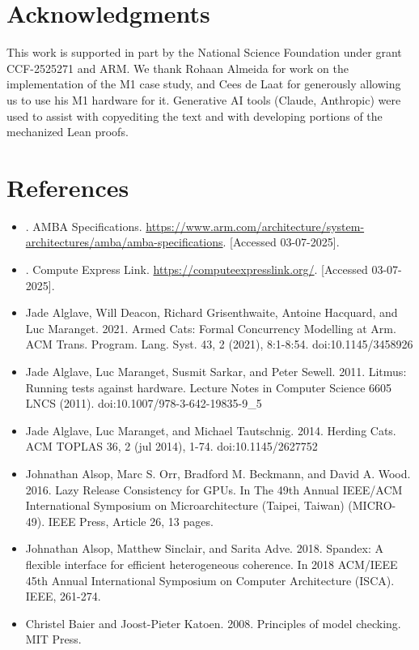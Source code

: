 \documentclass[10pt]{article}
\begin{document}
\section*{Acknowledgments}
This work is supported in part by the National Science Foundation under grant CCF-2525271 and ARM. We thank Rohaan Almeida for work on the implementation of the M1 case study, and Cees de Laat for generously allowing us to use his M1 hardware for it. Generative AI tools (Claude, Anthropic) were used to assist with copyediting the text and with developing portions of the mechanized Lean proofs.

\section*{References}
\begin{itemize}
  \item[] [1] [n. d.]. AMBA Specifications. \href{https://www.arm.com/architecture/system-architectures/amba/amba-specifications}{https://www.arm.com/architecture/system-architectures/amba/amba-specifications}. [Accessed 03-07-2025].
  \item[] [2] [n.d.]. Compute Express Link. \href{https://computeexpresslink.org/}{https://computeexpresslink.org/}. [Accessed 03-07-2025].
  \item[] [3] Jade Alglave, Will Deacon, Richard Grisenthwaite, Antoine Hacquard, and Luc Maranget. 2021. Armed Cats: Formal Concurrency Modelling at Arm. ACM Trans. Program. Lang. Syst. 43, 2 (2021), 8:1-8:54. doi:10.1145/3458926
  \item[] [4] Jade Alglave, Luc Maranget, Susmit Sarkar, and Peter Sewell. 2011. Litmus: Running tests against hardware. Lecture Notes in Computer Science 6605 LNCS (2011). doi:10.1007/978-3-642-19835-9\_5
  \item[] [5] Jade Alglave, Luc Maranget, and Michael Tautschnig. 2014. Herding Cats. ACM TOPLAS 36, 2 (jul 2014), 1-74. doi:10.1145/2627752
  \item[] [6] Johnathan Alsop, Marc S. Orr, Bradford M. Beckmann, and David A. Wood. 2016. Lazy Release Consistency for GPUs. In The 49th Annual IEEE/ACM International Symposium on Microarchitecture (Taipei, Taiwan) (MICRO-49). IEEE Press, Article 26, 13 pages.
  \item[] [7] Johnathan Alsop, Matthew Sinclair, and Sarita Adve. 2018. Spandex: A flexible interface for efficient heterogeneous coherence. In 2018 ACM/IEEE 45th Annual International Symposium on Computer Architecture (ISCA). IEEE, 261-274.
  \item[] [8] Christel Baier and Joost-Pieter Katoen. 2008. Principles of model checking. MIT Press.

\end{itemize}
\end{document}
